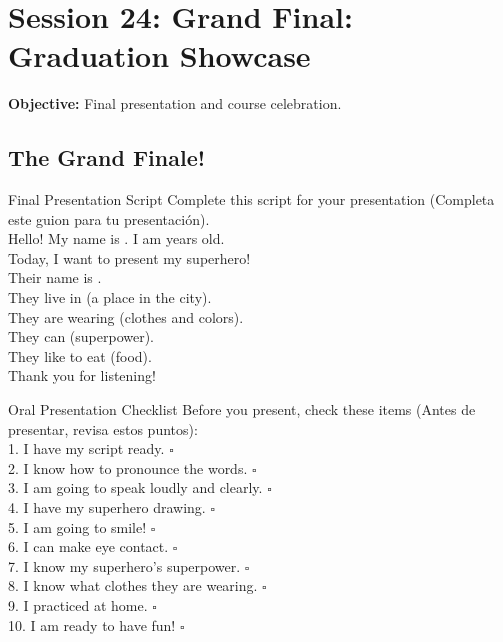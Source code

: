 \section*{Session 24: Grand Final: Graduation Showcase}
\textbf{Objective:} Final presentation and course celebration.

\subsection*{The Grand Finale!}

\begin{activity}{Final Presentation Script }
  Complete this script for your presentation (Completa este guion para tu presentación).\\
  
  Hello! My name is \answerline[4cm]. I am \answerline[2cm] years old.\\
  Today, I want to present my superhero!\\
  Their name is \answerline[4cm].\\
  They live in \answerline[4cm] (a place in the city).\\
  They are wearing \answerline[5cm] (clothes and colors).\\
  They can \answerline[5cm] (superpower).\\
  They like to eat \answerline[4cm] (food).\\
  Thank you for listening!
\end{activity}

\begin{activity}{Oral Presentation Checklist }
  Before you present, check these items (Antes de presentar, revisa estos puntos):\\
  
  1. I have my script ready. $\square$\\
  2. I know how to pronounce the words. $\square$\\
  3. I am going to speak loudly and clearly. $\square$\\
  4. I have my superhero drawing. $\square$\\
  5. I am going to smile! $\square$\\
  6. I can make eye contact. $\square$\\
  7. I know my superhero's superpower. $\square$\\
  8. I know what clothes they are wearing. $\square$\\
  9. I practiced at home. $\square$\\
  10. I am ready to have fun! $\square$
\end{activity}

